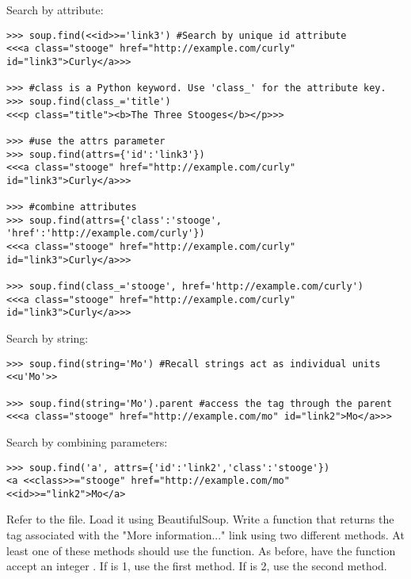 Search by attribute:
\begin{lstlisting}
>>> soup.find(<<id>>='link3') #Search by unique id attribute
<<<a class="stooge" href="http://example.com/curly" id="link3">Curly</a>>>

>>> #class is a Python keyword. Use 'class_' for the attribute key.
>>> soup.find(class_='title')
<<<p class="title"><b>The Three Stooges</b></p>>>

>>> #use the attrs parameter
>>> soup.find(attrs={'id':'link3'})
<<<a class="stooge" href="http://example.com/curly" id="link3">Curly</a>>>

>>> #combine attributes
>>> soup.find(attrs={'class':'stooge', 'href':'http://example.com/curly'})
<<<a class="stooge" href="http://example.com/curly" id="link3">Curly</a>>>

>>> soup.find(class_='stooge', href='http://example.com/curly')
<<<a class="stooge" href="http://example.com/curly" id="link3">Curly</a>>>
\end{lstlisting}

Search by string:
\begin{lstlisting}
>>> soup.find(string='Mo') #Recall strings act as individual units
<<u'Mo'>>

>>> soup.find(string='Mo').parent #access the tag through the parent
<<<a class="stooge" href="http://example.com/mo" id="link2">Mo</a>>>
\end{lstlisting}

Search by combining parameters:
\begin{lstlisting}
>>> soup.find('a', attrs={'id':'link2','class':'stooge'})
<a <<class>>="stooge" href="http://example.com/mo" <<id>>="link2">Mo</a>
\end{lstlisting}

\begin{problem}
Refer to the  file.
Load it using BeautifulSoup.
Write a function that returns the tag associated with the "More information..." link using two different methods.
At least one of these methods should use the  function.
As before, have the function accept an integer .
If  is 1, use the first method.
If  is 2, use the second method.
\end{problem}

